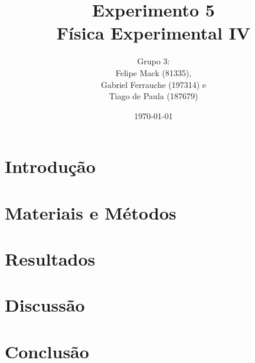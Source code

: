 \documentclass[a4paper,portuguese,utf8,T1]{article}
\title{
	Experimento 5                   \\
    \Large Física Experimental IV
}
\author{
	\small Grupo 3:					\\
	Felipe Mack (81335),			\\
    Gabriel Ferrauche (197314) e	\\
    Tiago de Paula (187679)
}
\date{\small\today}
\begin{document}
	\maketitle

	\begin{abstract}
    	\textit{}
	\end{abstract}

	\section{Introdução} \label{introducao}
		

	\section{Materiais e Métodos} \label{metodos}
    	

	\section{Resultados} \label{resultados}
	 	

	\section{Discussão} \label{discussao}
    	

    \section{Conclusão} \label{conclusao}
    	

    \printbibliography
\end{document}
